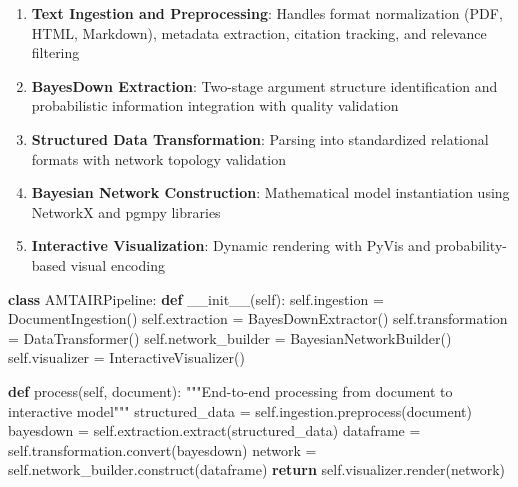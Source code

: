 \documentclass[
  11pt,
  letterpaper,
]{book}
\newenvironment{Shaded}{\begin{snugshade}}{\end{snugshade}}
\newcommand{\CommentTok}[1]{\textcolor[rgb]{0.37,0.37,0.37}{#1}}
\newcommand{\ControlFlowTok}[1]{\textcolor[rgb]{0.00,0.23,0.31}{\textbf{#1}}}
\newcommand{\FunctionTok}[1]{\textcolor[rgb]{0.28,0.35,0.67}{#1}}
\newcommand{\KeywordTok}[1]{\textcolor[rgb]{0.00,0.23,0.31}{\textbf{#1}}}
\newcommand{\NormalTok}[1]{\textcolor[rgb]{0.00,0.23,0.31}{#1}}
\newcommand{\OperatorTok}[1]{\textcolor[rgb]{0.37,0.37,0.37}{#1}}
\newcommand{\VariableTok}[1]{\textcolor[rgb]{0.07,0.07,0.07}{#1}}
\providecommand{\tightlist}{%
  \setlength{\itemsep}{0pt}\setlength{\parskip}{0pt}}
\begin{document}
\begin{enumerate}
\def\labelenumi{\arabic{enumi}.}
\tightlist
\item
  \textbf{Text Ingestion and Preprocessing}: Handles format
  normalization (PDF, HTML, Markdown), metadata extraction, citation
  tracking, and relevance filtering
\item
  \textbf{BayesDown Extraction}: Two-stage argument structure
  identification and probabilistic information integration with quality
  validation
\item
  \textbf{Structured Data Transformation}: Parsing into standardized
  relational formats with network topology validation
\item
  \textbf{Bayesian Network Construction}: Mathematical model
  instantiation using NetworkX and pgmpy libraries
\item
  \textbf{Interactive Visualization}: Dynamic rendering with PyVis and
  probability-based visual encoding
\end{enumerate}

\begin{Shaded}
\begin{Highlighting}[]
\KeywordTok{class}\NormalTok{ AMTAIRPipeline:}
    \KeywordTok{def} \FunctionTok{\_\_init\_\_}\NormalTok{(}\VariableTok{self}\NormalTok{):}
        \VariableTok{self}\NormalTok{.ingestion }\OperatorTok{=}\NormalTok{ DocumentIngestion()}
        \VariableTok{self}\NormalTok{.extraction }\OperatorTok{=}\NormalTok{ BayesDownExtractor() }
        \VariableTok{self}\NormalTok{.transformation }\OperatorTok{=}\NormalTok{ DataTransformer()}
        \VariableTok{self}\NormalTok{.network\_builder }\OperatorTok{=}\NormalTok{ BayesianNetworkBuilder()}
        \VariableTok{self}\NormalTok{.visualizer }\OperatorTok{=}\NormalTok{ InteractiveVisualizer()}
    
    \KeywordTok{def}\NormalTok{ process(}\VariableTok{self}\NormalTok{, document):}
        \CommentTok{"""End{-}to{-}end processing from document to interactive model"""}
\NormalTok{        structured\_data }\OperatorTok{=} \VariableTok{self}\NormalTok{.ingestion.preprocess(document)}
\NormalTok{        bayesdown }\OperatorTok{=} \VariableTok{self}\NormalTok{.extraction.extract(structured\_data)}
\NormalTok{        dataframe }\OperatorTok{=} \VariableTok{self}\NormalTok{.transformation.convert(bayesdown)}
\NormalTok{        network }\OperatorTok{=} \VariableTok{self}\NormalTok{.network\_builder.construct(dataframe)}
        \ControlFlowTok{return} \VariableTok{self}\NormalTok{.visualizer.render(network)}
\end{Highlighting}
\end{Shaded}
\end{document}
